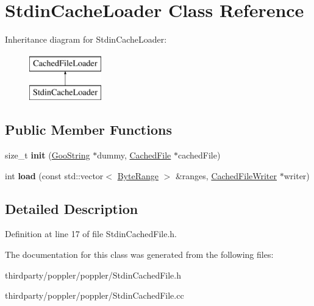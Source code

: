 \hypertarget{class_stdin_cache_loader}{}\section{Stdin\+Cache\+Loader Class Reference}
\label{class_stdin_cache_loader}
Inheritance diagram for Stdin\+Cache\+Loader\+:\begin{figure}[H]
\begin{center}
\leavevmode
\includegraphics[height=2.000000cm]{class_stdin_cache_loader}
\end{center}
\end{figure}
\subsection*{Public Member Functions}
\begin{DoxyCompactItemize}
\item 
\mbox{\label{class_stdin_cache_loader_a8c81fe36040d367d420d93e4886808d0}} 
size\+\_\+t {\bfseries init} (\hyperlink{class_goo_string}{Goo\+String} $\ast$dummy, \hyperlink{class_cached_file}{Cached\+File} $\ast$cached\+File)
\item 
\mbox{\label{class_stdin_cache_loader_a47b1246f1a00e837f310a99a9daed7c3}} 
int {\bfseries load} (const std\+::vector$<$ \hyperlink{struct___byte_range}{Byte\+Range} $>$ \&ranges, \hyperlink{class_cached_file_writer}{Cached\+File\+Writer} $\ast$writer)
\end{DoxyCompactItemize}


\subsection{Detailed Description}


Definition at line 17 of file Stdin\+Cached\+File.\+h.



The documentation for this class was generated from the following files\+:\begin{DoxyCompactItemize}
\item 
thirdparty/poppler/poppler/Stdin\+Cached\+File.\+h\item 
thirdparty/poppler/poppler/Stdin\+Cached\+File.\+cc\end{DoxyCompactItemize}
